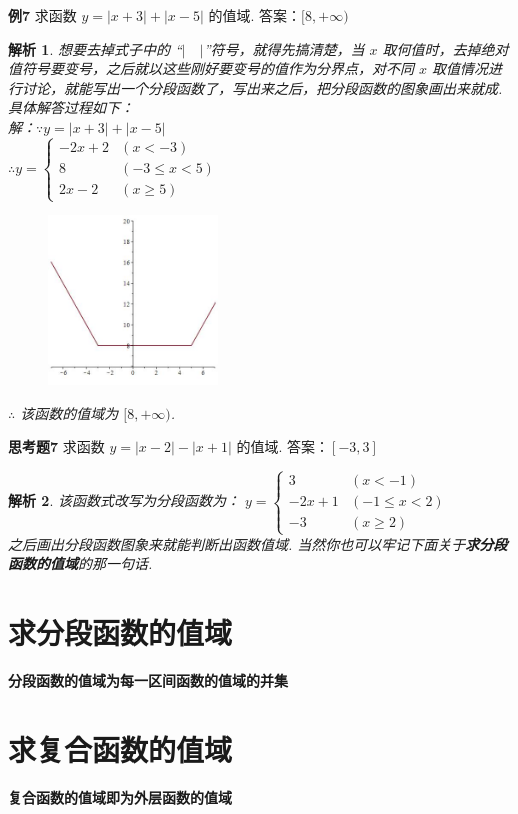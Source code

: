\documentclass{article}
\theoremstyle{plain}
\newtheorem{aly}{解析}
\begin{document}
\textbf{例7} 求函数 $y=|x+3|+|x-5|$ 的值域. \hspace{25pt} 答案：$[8, +\infty)$

\begin{aly}
  想要去掉式子中的 “$|\quad|$”符号，就得先搞清楚，当 $x$ 取何值时，去掉绝对值符号要变号，之后就以这些刚好要变号的值作为分界点，对不同 $x$ 取值情况进行讨论，就能写出一个分段函数了，写出来之后，把分段函数的图象画出来就成. 具体解答过程如下：\\
  解：$\because y=|x+3|+|x-5|$\\
  $\therefore y=\left\{
  \begin{array}{ll}
     -2x+2 & (x < -3) \\
     8 & (-3 \leqslant x < 5) \\
     2x-2 & (x \geqslant 5)
  \end{array}\right.$
\begin{figure}[h]
  \centering
  \includegraphics[width=4.5cm]{7-1.jpg}
\end{figure}

  $\therefore$ 该函数的值域为 $[8,+\infty)$.
\end{aly}

\textbf{思考题7} 求函数 $y=|x-2|-|x+1|$ 的值域. \hspace{25pt} 答案：$[-3,3]$
\begin{aly}
  该函数式改写为分段函数为：
  $y=\left\{
    \begin{array}{ll}
    3 & (x < -1) \\
    -2x+1 & (-1 \leqslant x < 2) \\
    -3 & (x \geqslant 2)
  \end{array}\right.$  \\之后画出分段函数图象来就能判断出函数值域. 当然你也可以牢记下面关于\textbf{求分段函数的值域}的那一句话.
\end{aly}


\section{求分段函数的值域}
\textbf{分段函数的值域为每一区间函数的值域的并集}

\section{求复合函数的值域}
\textbf{复合函数的值域即为外层函数的值域}
\end{document}
